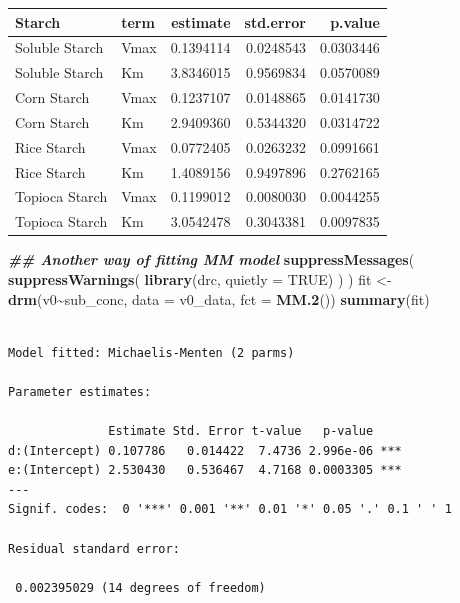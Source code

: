 \documentclass[
  12pt,
]{article}
\newenvironment{Shaded}{\begin{snugshade}}{\end{snugshade}}
\newcommand{\AttributeTok}[1]{\textcolor[rgb]{0.13,0.29,0.53}{#1}}
\newcommand{\ConstantTok}[1]{\textcolor[rgb]{0.56,0.35,0.01}{#1}}
\newcommand{\DocumentationTok}[1]{\textcolor[rgb]{0.56,0.35,0.01}{\textbf{\textit{#1}}}}
\newcommand{\FunctionTok}[1]{\textcolor[rgb]{0.13,0.29,0.53}{\textbf{#1}}}
\newcommand{\NormalTok}[1]{#1}
\newcommand{\OtherTok}[1]{\textcolor[rgb]{0.56,0.35,0.01}{#1}}
\newcommand{\SpecialCharTok}[1]{\textcolor[rgb]{0.81,0.36,0.00}{\textbf{#1}}}
\newcounter{none} %
\begin{document}
{\def\LTcaptype{none} %
\begin{longtable}[]{@{}llrrr@{}}
\toprule\noalign{}
Starch & term & estimate & std.error & p.value \\
\midrule\noalign{}
\endhead
\bottomrule\noalign{}
\endlastfoot
Soluble Starch & Vmax & 0.1394114 & 0.0248543 & 0.0303446 \\
Soluble Starch & Km & 3.8346015 & 0.9569834 & 0.0570089 \\
Corn Starch & Vmax & 0.1237107 & 0.0148865 & 0.0141730 \\
Corn Starch & Km & 2.9409360 & 0.5344320 & 0.0314722 \\
Rice Starch & Vmax & 0.0772405 & 0.0263232 & 0.0991661 \\
Rice Starch & Km & 1.4089156 & 0.9497896 & 0.2762165 \\
Topioca Starch & Vmax & 0.1199012 & 0.0080030 & 0.0044255 \\
Topioca Starch & Km & 3.0542478 & 0.3043381 & 0.0097835 \\
\end{longtable}
}

\begin{Shaded}
\begin{Highlighting}[]
\DocumentationTok{\#\# Another way of fitting MM model}
\FunctionTok{suppressMessages}\NormalTok{(}
  \FunctionTok{suppressWarnings}\NormalTok{(}
    \FunctionTok{library}\NormalTok{(drc, }\AttributeTok{quietly =} \ConstantTok{TRUE}\NormalTok{)}
\NormalTok{  )}
\NormalTok{)}
\NormalTok{fit }\OtherTok{\textless{}{-}} \FunctionTok{drm}\NormalTok{(v0}\SpecialCharTok{\textasciitilde{}}\NormalTok{sub\_conc, }\AttributeTok{data =}\NormalTok{ v0\_data, }\AttributeTok{fct =} \FunctionTok{MM.2}\NormalTok{())}
\FunctionTok{summary}\NormalTok{(fit)}
\end{Highlighting}
\end{Shaded}

\begin{verbatim}

Model fitted: Michaelis-Menten (2 parms)

Parameter estimates:

              Estimate Std. Error t-value   p-value    
d:(Intercept) 0.107786   0.014422  7.4736 2.996e-06 ***
e:(Intercept) 2.530430   0.536467  4.7168 0.0003305 ***
---
Signif. codes:  0 '***' 0.001 '**' 0.01 '*' 0.05 '.' 0.1 ' ' 1

Residual standard error:

 0.002395029 (14 degrees of freedom)
\end{verbatim}
\end{document}
